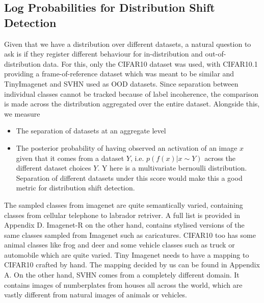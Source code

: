 \documentclass{article}
\begin{document}
        \subsection{Log Probabilities for Distribution Shift Detection}
            Given that we have a distribution over different datasets, a natural question to ask is if they register different behaviour for in-distribution and out-of-distribution data. For this, only the CIFAR10 dataset was used, with CIFAR10.1 \cite{recht2018cifar10classifiersgeneralizecifar10} providing a frame-of-reference dataset which was meant to be similar and TinyImagenet \cite{Le2015TinyIV} and SVHN \cite{37648} used as OOD datasets. Since separation between individual classes cannot be tracked because of label incoherence, the comparison is made across the distribution aggregated over the entire dataset. Alongside this, we measure 
            \begin{itemize}
                \item 
                    The separation of datasets at an aggregate level
                \item 
                    The posterior probability of having observed an activation of an image $x$ given that it comes from a dataset $Y$, i.e. $p(f(x)| x \sim Y)$ across the different dataset choices $Y$. Y here is a multivariate bernoulli distribution. Separation of different datasets under this score would make this a good metric for distribution shift detection. 
            \end{itemize}
            The sampled classes from imagenet are quite semantically varied, containing classes from cellular telephone to labrador retriver. A full list is provided in Appendix D. Imagenet-R on the other hand, contains stylised versions of the same classes sampled from Imagenet such as caricatures. CIFAR10 too has some animal classes like frog and deer and some vehicle classes such as truck or automobile which are quite varied. Tiny Imagenet needs to have a mapping to CIFAR10 crafted by hand. The mapping decided by us can be found in Appendix A. On the other hand, SVHN comes from a completely different domain. It contains images of numberplates from houses all across the world, which are vastly different from natural images of animals or vehicles. 
        
\end{document}
